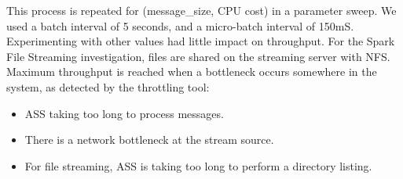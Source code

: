 \documentclass[letterpaper,conference]{IEEEtran}
\begin{document}



This process is repeated for (message\_size, CPU cost) in a parameter sweep. 
We used a batch interval of 5 seconds, and a micro-batch interval of 150mS. Experimenting with other values had little impact on throughput. For the Spark File Streaming investigation, files are shared on the streaming server with NFS. %
Maximum throughput is reached when a bottleneck occurs somewhere in the system, as detected by the throttling tool:
\begin{itemize}
\item ASS taking too long to process messages.%
\item There is a network bottleneck at the stream source.%
\item For file streaming, ASS is taking too long to perform a directory listing.%
\end{itemize}


\end{document}
